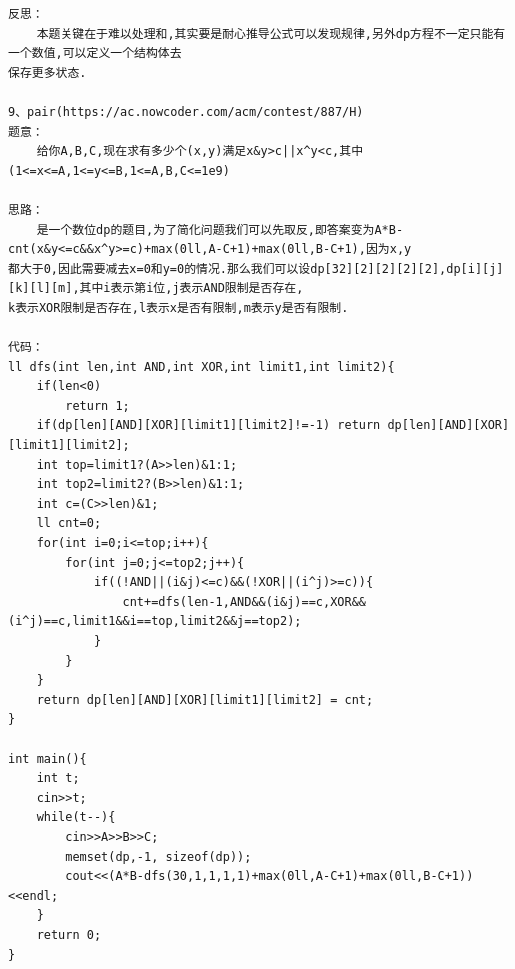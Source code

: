 \documentclass[twoside]{article}
\begin{document}
\begin{lstlisting}
反思：
    本题关键在于难以处理和,其实要是耐心推导公式可以发现规律,另外dp方程不一定只能有一个数值,可以定义一个结构体去
保存更多状态.

9、pair(https://ac.nowcoder.com/acm/contest/887/H)
题意：
    给你A,B,C,现在求有多少个(x,y)满足x&y>c||x^y<c,其中(1<=x<=A,1<=y<=B,1<=A,B,C<=1e9)

思路：
    是一个数位dp的题目,为了简化问题我们可以先取反,即答案变为A*B-cnt(x&y<=c&&x^y>=c)+max(0ll,A-C+1)+max(0ll,B-C+1),因为x,y
都大于0,因此需要减去x=0和y=0的情况.那么我们可以设dp[32][2][2][2][2],dp[i][j][k][l][m],其中i表示第i位,j表示AND限制是否存在,
k表示XOR限制是否存在,l表示x是否有限制,m表示y是否有限制.

代码：
ll dfs(int len,int AND,int XOR,int limit1,int limit2){
    if(len<0)
        return 1;
    if(dp[len][AND][XOR][limit1][limit2]!=-1) return dp[len][AND][XOR][limit1][limit2];
    int top=limit1?(A>>len)&1:1;
    int top2=limit2?(B>>len)&1:1;
    int c=(C>>len)&1;
    ll cnt=0;
    for(int i=0;i<=top;i++){
        for(int j=0;j<=top2;j++){
            if((!AND||(i&j)<=c)&&(!XOR||(i^j)>=c)){
                cnt+=dfs(len-1,AND&&(i&j)==c,XOR&&(i^j)==c,limit1&&i==top,limit2&&j==top2);
            }
        }
    }
    return dp[len][AND][XOR][limit1][limit2] = cnt;
}
 
int main(){
    int t;
    cin>>t;
    while(t--){
        cin>>A>>B>>C;
        memset(dp,-1, sizeof(dp));
        cout<<(A*B-dfs(30,1,1,1,1)+max(0ll,A-C+1)+max(0ll,B-C+1))<<endl;
    }
    return 0;
}\end{lstlisting}
\end{document}
